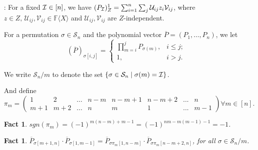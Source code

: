 \documentclass[12pt,reqno]{article}
\newtheorem{fact}[theorem]{Fact}
\newcommand\F{\ensuremath{\mathbb F}}
\newcommand{\cd}{\cdot}
\newcommand{\freea}{\ensuremath{\F\langle X\rangle}}
\newenvironment{proof}{\QuadSpace\par\noindent{\bf Proof}:}{\EndProof\HalfSpace}
\newcommand{\QuadSpace}{\vspace{0.25\baselineskip}}
\newcommand{\HalfSpace}{\vspace{0.5\baselineskip}}
\newcommand{\EndProof}{ \hfill \vrule width 1ex height 1ex depth 0pt }
\newcommand{\set}[1]{\left\{#1\right\}}
\newcommand{\nx}[1]{#1_1,\ldots,#1_{n}}
\renewcommand{\t}[1]{\overline{#1}}
\newcommand{\s}{\sigma}
\newcommand{\zd}[2]{(#1)_Z^{#2}}
\renewcommand{\S}{\mathcal{S}}
\newcommand\ii{{\cal I}}
\newcommand{\U}{\mathcal U_{ij}}
\newcommand{\V}{\mathcal V_{ij}}
\newcommand{\uzv}{\sum_{i=1}^n\sum_{j}\U z_i\V}
\begin{document}
\begin{proof}
For  a fixed ${\ii}\in [n]$, we have $\zd{ P_\ii}{1 }=\uzv$, where $z \in Z,\, \U,\V\in\freea$ and $\U,\V$ are $Z$-independent.

For a permutation $\s\in \S_n$ and the polynomial vector $\t P= (\nx{P})$, we let
$$(\t P)_{\s[i,j]}=\left\{
\begin{array}{ll}
\prod_{m=i}^j P_{\s(m)}, & i\leq j; \\
 1, & i>j.
\end{array}\right. $$

We write $\S_n/m$  to denote the set $\set{\s\in \S_n\;|\;\s(m)=\ii}$.


And define $$\pi_m = \left(\begin{array}{cccccccc}
1 &2 &...& n-m&n-m+1&n-m+2&...&n\\                                                                                                                                                                                                                                                                                                                                m+1 &m+2 & ...&n&m& 1 &...&m-1
\end{array}\right) \forall m\in [n]
.$$



\begin{fact}\label{fac:sign}
  $sgn(\pi_m)=(-1)^{m(n-m)+m-1}=(-1)^{nm-m(m-1)-1}=-1$.
\end{fact}
\begin{fact}\label{fac:perm-transfer}
  $ \t{P}_{\s[m+1,n]}\cd \t{P}_{\s[1,m-1]}=\t{P}_{\s\pi_m[1,n-m]}\cd \t{P}_{\s\pi_m[n-m+2,n]}$, for all $\s\in \S_n/m$.
\end{fact}


\end{proof}
\end{document}
